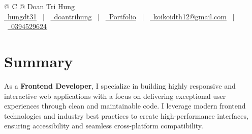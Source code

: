 \documentclass[a4paper,12pt]{article}
\begin{document}
\pagestyle{fancy} 



\begin{tabularx}{\linewidth}{@{} C @{}}
\Huge{Doan Tri Hung} \\[7.5pt]
\href{https://github.com/hungdt31}{\raisebox{-0.05\height}\faGithub\ hungdt31} \ $|$ \ 
\href{https://www.linkedin.com/in/hungdt31}{\raisebox{-0.05\height}\faLinkedin\ doantrihung} \ $|$ \ 
\href{https://dthretro-portfolio.vercel.app}{\raisebox{-0.05\height}\faGlobe \ Portfolio} \ $|$ \ 
\href{mailto:koikoidth12@gmail.com}{\raisebox{-0.05\height}\faEnvelope \ koikoidth12@gmail.com} \ $|$ \ 
\href{tel:0394529624}{\raisebox{-0.05\height}\faMobile \ 0394529624} \\
\end{tabularx}


\section{Summary}
As a \textbf{Frontend Developer}, I specialize in building highly responsive and interactive web applications with a focus on delivering exceptional user experiences through clean and maintainable code. I leverage modern frontend technologies and industry best practices to create high-performance interfaces, ensuring accessibility and seamless cross-platform compatibility.

\end{document}
